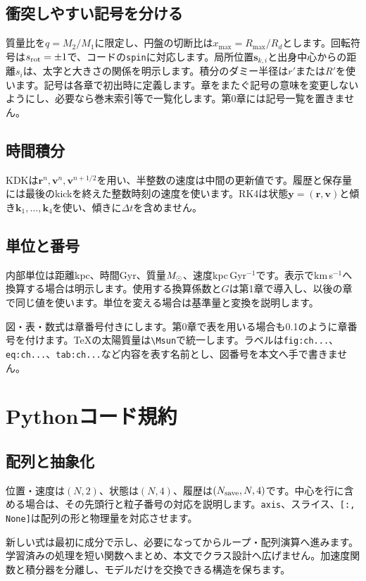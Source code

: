 \documentclass[10pt,openany]{book}
\begin{document}
\subsection{衝突しやすい記号を分ける}
質量比を$q=M_2/M_1$に限定し、円盤の切断比は$x_{\max}=R_{\max}/R_d$とします。回転符号は$s_{\rm rot}=\pm1$で、コードの\texttt{spin}に対応します。局所位置$\boldsymbol s_{k,i}$と出身中心からの距離$s_i$は、太字と大きさの関係を明示します。積分のダミー半径は$r'$または$R'$を使います。記号は各章で初出時に定義します。章をまたぐ記号の意味を変更しないようにし、必要なら巻末索引等で一覧化します。第0章には記号一覧を置きません。
\subsection{時間積分}
KDKは$\boldsymbol r^n,\boldsymbol v^n,\boldsymbol v^{n+1/2}$を用い、半整数の速度は中間の更新値です。履歴と保存量には最後のkickを終えた整数時刻の速度を使います。RK4は状態$\boldsymbol y=(\boldsymbol r,\boldsymbol v)$と傾き$\boldsymbol k_1,\ldots,\boldsymbol k_4$を使い、傾きに$\Delta t$を含めません。
\subsection{単位と番号}
内部単位は距離kpc、時間Gyr、質量$M_\odot$、速度kpc\,Gyr$^{-1}$です。表示でkm\,s$^{-1}$へ換算する場合は明示します。使用する換算係数と$G$は第1章で導入し、以後の章で同じ値を使います。単位を変える場合は基準量と変換を説明します。

図・表・数式は章番号付きにします。第0章で表を用いる場合も0.1のように章番号を付けます。TeXの太陽質量は\verb|\Msun|で統一します。ラベルは\texttt{fig:ch...}、\texttt{eq:ch...}、\texttt{tab:ch...}など内容を表す名前とし、図番号を本文へ手で書きません。

\section{Pythonコード規約}
\subsection{配列と抽象化}
位置・速度は$(N,2)$、状態は$(N,4)$、履歴は$(N_{\rm save},N,4)$です。中心を行に含める場合は、その先頭行と粒子番号の対応を説明します。\texttt{axis}、スライス、\texttt{[:, None]}は配列の形と物理量を対応させます。

新しい式は最初に成分で示し、必要になってからループ・配列演算へ進みます。学習済みの処理を短い関数へまとめ、本文でクラス設計へ広げません。加速度関数と積分器を分離し、モデルだけを交換できる構造を保ちます。
\end{document}

